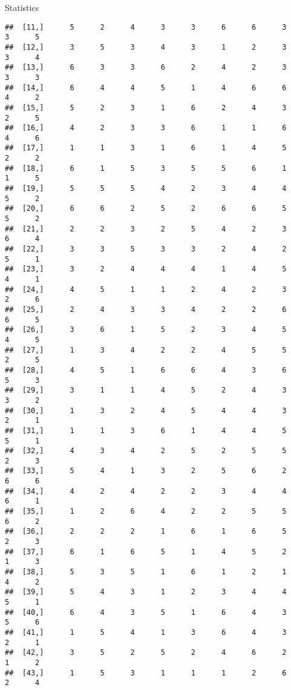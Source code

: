\documentclass[
  ignorenonframetext,
]{beamer}
\begin{document}
\begin{frame}[fragile]{Statistics}
\begin{verbatim}
##  [11,]      5      2      4      3      3      6      6      3      3      5
##  [12,]      3      5      3      4      3      1      2      3      3      4
##  [13,]      6      3      3      6      2      4      2      3      3      3
##  [14,]      6      4      4      5      1      4      6      6      4      2
##  [15,]      5      2      3      1      6      2      4      3      2      5
##  [16,]      4      2      3      3      6      1      1      6      4      6
##  [17,]      1      1      3      1      6      1      4      5      2      2
##  [18,]      6      1      5      3      5      5      6      1      1      5
##  [19,]      5      5      5      4      2      3      4      4      5      2
##  [20,]      6      6      2      5      2      6      6      5      5      2
##  [21,]      2      2      3      2      5      4      2      3      6      4
##  [22,]      3      3      5      3      3      2      4      2      5      1
##  [23,]      3      2      4      4      4      1      4      5      4      1
##  [24,]      4      5      1      1      2      4      2      3      2      6
##  [25,]      2      4      3      3      4      2      2      6      6      5
##  [26,]      3      6      1      5      2      3      4      5      4      5
##  [27,]      1      3      4      2      2      4      5      5      2      5
##  [28,]      4      5      1      6      6      4      3      6      5      3
##  [29,]      3      1      1      4      5      2      4      3      3      2
##  [30,]      1      3      2      4      5      4      4      3      2      1
##  [31,]      1      1      3      6      1      4      4      5      5      1
##  [32,]      4      3      4      2      5      2      5      5      2      3
##  [33,]      5      4      1      3      2      5      6      2      6      6
##  [34,]      4      2      4      2      2      3      4      4      6      1
##  [35,]      1      2      6      4      2      2      5      5      6      2
##  [36,]      2      2      2      1      6      1      6      5      2      3
##  [37,]      6      1      6      5      1      4      5      2      1      3
##  [38,]      5      3      5      1      6      1      2      1      4      2
##  [39,]      5      4      3      1      2      3      4      4      5      1
##  [40,]      6      4      3      5      1      6      4      3      5      6
##  [41,]      1      5      4      1      3      6      4      3      2      1
##  [42,]      3      5      2      5      2      4      6      2      1      2
##  [43,]      1      5      3      1      1      1      2      6      2      4

\end{verbatim}
\end{frame}
\end{document}
